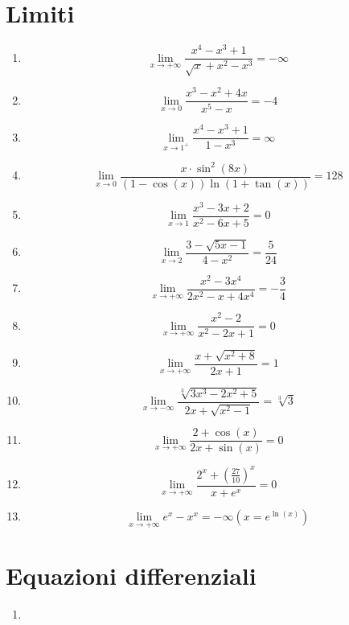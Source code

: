 \documentclass[10pt]{article}
\begin{document}
\section{Limiti}
	\begin{multicols}{2}
		\begin{enumerate}
			\item $$\lim_{x\to+\infty} \frac{x^4 - x^3 + 1}{\sqrt{x} + x^2 - x^3} = -\infty$$
			\item $$\lim_{x\to0} \frac{x^3 - x^2 + 4x}{x^5 - x} = -4$$
			\item $$\lim_{x\to1^+} \frac{x^4 - x^3 + 1}{1 - x^3} = \infty$$
			\item $$\lim_{x\to0} \frac{x\cdot\sin^2(8x)}{(1 - \cos(x))\ln(1 + \tan(x))} = 128$$
			\item $$\lim_{x\to1} \frac{x^3 - 3x + 2}{x^2 - 6x + 5} = 0$$
			\item $$\lim_{x\to2} \frac{3 - \sqrt{5x - 1}}{4 - x^2} = \frac{5}{24}$$
			\item $$\lim_{x\to+\infty} \frac{x^2 - 3x^4}{2x^2 - x + 4x^4} = -\frac{3}{4}$$
			\item $$\lim_{x\to+\infty} \frac{x^2 - 2}{x^2 - 2x + 1} = 0$$
			\item $$\lim_{x\to+\infty} \frac{x + \sqrt{x^2 + 8}}{2x + 1} = 1$$
			\item $$\lim_{x\to-\infty} \frac{\sqrt[3]{3x^3 - 2x^2 + 5}}{2x + \sqrt{x^2 - 1}} = \sqrt[3]{3}$$
			\item $$\lim_{x\to+\infty} \frac{2 + \cos(x)}{2x + \sin(x)} = 0$$
			\item $$\lim_{x\to+\infty} \frac{2^x + (\frac{27}{10})^x}{x + e^x} = 0$$
			\item $$\lim_{x\to+\infty} e^x - x^x = -\infty (x = e^{\ln(x)})$$
		\end{enumerate}
	\end{multicols}
\pagebreak
\section{Equazioni differenziali}
	\begin{multicols}{2}
		\begin{enumerate}
			\item 
		\end{enumerate}
	\end{multicols}
\end{document}
